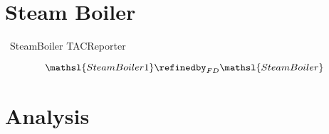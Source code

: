 \documentclass{report} %
\begin{document}
\chapter{Steam Boiler}
\begin{circus}
  \circprocess\ SteamBoiler \circdef TACReporter
\end{circus}

\[
  \mathsl{SteamBoiler1} \refinedby_{FD} \mathsl{SteamBoiler}
\]


\chapter{Analysis}

%
\end{document}
